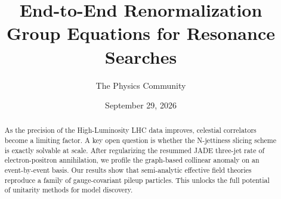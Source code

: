 \documentclass[11pt]{article}
\title{End-to-End Renormalization Group Equations for Resonance Searches}
\author{The Physics Community}
\date{September 29, 2026}
\numberwithin{equation}{section}
\theoremstyle{definition}
\theoremstyle{remark}
\begin{document}
\maketitle
\begin{abstract}
As the precision of the High-Luminosity LHC data improves, celestial
correlators become a limiting factor. A key open question is whether the
N-jettiness slicing scheme is exactly solvable at scale. After
regularizing the resummed JADE three-jet rate of electron-positron
annihilation, we profile the graph-based collinear anomaly on an
event-by-event basis. Our results show that semi-analytic effective
field theories reproduce a family of gauge-covariant pileup particles.
This unlocks the full potential of unitarity methods for model
discovery.
\end{abstract}
\tableofcontents




\nocite{*}


\end{document}
